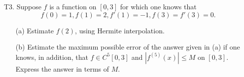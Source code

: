 \documentclass[12pt]{report}
\begin{document}
\newpage



\begin{problem}
    T3. Suppose $f$ is a function on $[0,3]$ for which one knows that
    \[ 
        f(0) = 1, f(1) = 2, f'(1) = -1, f(3) = f'(3) = 0.
    \]
    \begin{enumerate}
        \item [(a)] Estimate $f(2)$, using Hermite interpolation.    
        \item [(b)] Estimate the maximum possible error of the answer given in (a) if one knows, in addition, that $f \in C^5[0,3]$ and $|f^{(5)}(x)| \leq M$ on $[0,3]$. Express the answer in terms of $M$.
    \end{enumerate}

\end{problem}
\end{document}
